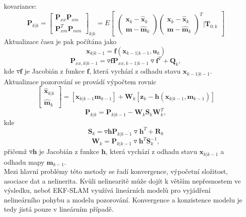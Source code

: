 \documentclass[12pt]{report}
\begin{document}
\indent kovariance:
\begin{equation}
	\textbf{P}_{k|k}=\begin{bmatrix}
	\textbf{P}_{xx} \textbf{P}_{xm}\\\textbf{P}^T_{xm} \textbf{P}_{mm}
	\end{bmatrix}_{k|k}=E\begin{bmatrix}
	\begin{pmatrix}
	\textbf{x}_k-\hat{\textbf{x}}_k\\\textbf{m}-\hat{\textbf{m}}_k
	\end{pmatrix} \begin{pmatrix}
	\textbf{x}_k-\hat{\textbf{x}}_k\\\textbf{m}-\hat{\textbf{m}}_k
	\end{pmatrix}^T |\textbf{T}_{0:k}
	\end{bmatrix}
\end{equation}
Aktualizace času je pak počítána jako
\begin{equation}
\textbf{\^{x}}_{k|k-1}=\textbf{f}(\textbf{\^{x}}_{k-1|k-1},\textbf{u}_{k})
\end{equation}
\begin{equation}
	\textbf{P}_{xx,k|k-1}=\triangledown\textbf{f}\textbf{P}_{xx,k-1|k-1}\triangledown\textbf{f}^T+\textbf{Q}_k,
\end{equation}
kde $\triangledown\textbf{f}$ je Jacobián z funkce $\textbf{f}$, která vychází z odhadu stavu $\textbf{\^{x}}_{k-1|k-1}$.\\
\indent Aktualizace pozorování se provádí výpočtem rovnic
\begin{equation}
	\begin{bmatrix}
	\hat{\textbf{x}}_{k|k}\\\hat{\textbf{m}}_k
	\end{bmatrix}=
	[\textbf{\^{x}}_{k|k-1}\textbf{\^{m}}_{k-1}]+\textbf{W}_{k}[\textbf{z}_k-\textbf{h}(\textbf{\^{x}}_{k|k-1},\textbf{\^{m}}_{k-1})]
\end{equation}
\begin{equation}
	\textbf{P}_{k|k}=\textbf{P}_{k|k-1}-\textbf{W}_k\textbf{S}_k\textbf{W}^T_k,
\end{equation}
kde 
\begin{equation}
	\textbf{S}_k=\triangledown\textbf{h}\textbf{P}_{k|k-1}\triangledown\textbf{h}^T+\textbf{R}_k
\end{equation}
\begin{equation}
	\textbf{W}_k=\textbf{P}_{k|k-1}\triangledown\textbf{h}^T\textbf{S}^{-1}_k,
\end{equation}
přičemž $\triangledown\textbf{h}$ je Jacobián z funkce $\textbf{h}$, která vychází z odhadu stavu $\textbf{\^{x}}_{k|k-1}$ a odhadu mapy $\textbf{\^{m}}_{k-1}$.\\
\indent Mezi hlavní problémy této metody se řadí konvergence, výpočetní složitost, asociace dat a nelinerita. Kvůli nelinearitě může dojít k větším nepřesnostem ve výsledku, neboť EKF-SLAM využívá lineárních modelů pro vyjádření nelineárního pohybu a modelu pozorování. Konvergence a konzistence modelu je tedy jistá pouze v lineárním případě. 
\end{document}
